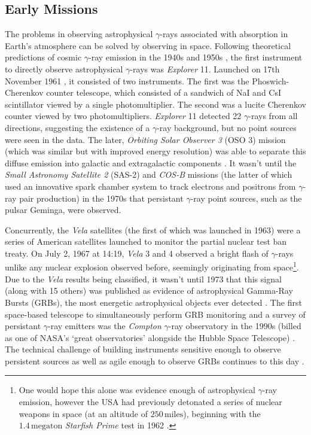 \subsection{Early Missions}
The problems in observing astrophysical $\gamma$-rays associated with absorption in Earth's atmosphere can be solved by observing in space. Following theoretical predictions of cosmic $\gamma$-ray emission in the 1940s and 1950s \cite{morrison}, the first instrument to directly observe astrophysical $\gamma$-rays was \textit{Explorer} 11. Launched on 17th November 1961 \cite{explorer}, it consisted of two instruments. The first was the Phoswich-Cherenkov counter telescope, which consisted of a sandwich of NaI and CsI scintillator viewed by a single photomultiplier. The second was a lucite Cherenkov counter viewed by two photomultipliers. \textit{Explorer} 11 detected 22 $\gamma$-rays from all directions, suggesting the existence of a $\gamma$-ray background, but no point sources were seen in the data. The later, \textit{Orbiting Solar Observer 3} (OSO 3) mission (which was similar but with improved energy resolution) was able to separate this diffuse emission into galactic and extragalactic components \cite{oso3}. It wasn't until the \textit{Small Astronomy Satellite 2} (SAS-2) \cite{sas2} and \textit{COS-B} \cite{cosb} missions (the latter of which used an innovative spark chamber system to track electrons and positrons from $\gamma$-ray pair production) in the 1970s that persistant $\gamma$-ray point sources, such as the pulsar Geminga, were observed.

Concurrently, the \textit{Vela} satellites (the first of which was launched in 1963) were a series of American satellites launched to monitor the partial nuclear test ban treaty. On July 2, 1967 at 14:19, \textit{Vela} 3 and 4 observed a bright flash of $\gamma$-rays unlike any nuclear explosion observed before, seemingly originating from space\footnote{One would hope this alone was evidence enough of astrophysical $\gamma$-ray emission, however the USA had previously detonated a series of nuclear weapons in space (at an altitude of $\mathrm{250\,miles}$), beginning with the $\mathrm{1.4\,megaton}$ \textit{Starfish Prime} test in 1962 \cite{starfish}.}. Due to the \textit{Vela} results being classified, it wasn't until 1973 that this signal (along with 15 others) was published as evidence of astrophysical Gamma-Ray Bursts (GRBs), the most energetic astrophysical objects ever detected \cite{velagrb}. The first space-based telescope to simultaneously perform GRB monitoring and a survey of persistant $\gamma$-ray emitters was the \textit{Compton} $\gamma$-ray observatory in the 1990s (billed as one of NASA's `great observatories' alongside the Hubble Space Telescope) \cite{compton}. The technical challenge of building instruments sensitive enough to observe persistent sources as well as agile enough to observe GRBs continues to this day \cite{magicGRB}.

